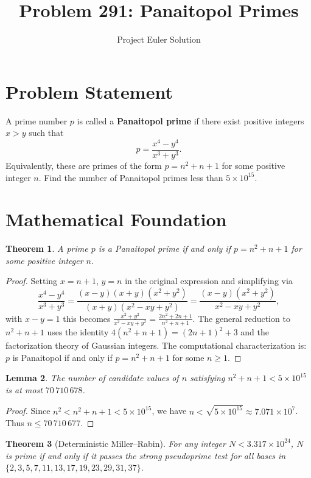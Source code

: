 \documentclass[12pt]{article}
\title{Problem 291: Panaitopol Primes}
\author{Project Euler Solution}
\date{}
\newtheorem{theorem}{Theorem}
\newtheorem{lemma}[theorem]{Lemma}
\begin{document}
\maketitle

\section{Problem Statement}
A prime number $p$ is called a \textbf{Panaitopol prime} if there exist positive integers $x > y$ such that
\[
p = \frac{x^4 - y^4}{x^3 + y^3}.
\]
Equivalently, these are primes of the form $p = n^2 + n + 1$ for some positive integer $n$. Find the number of Panaitopol primes less than $5 \times 10^{15}$.

\section{Mathematical Foundation}

\begin{theorem}
A prime $p$ is a Panaitopol prime if and only if $p = n^2 + n + 1$ for some positive integer $n$.
\end{theorem}

\begin{proof}
Setting $x = n+1$, $y = n$ in the original expression and simplifying via
\[
\frac{x^4 - y^4}{x^3 + y^3} = \frac{(x-y)(x+y)(x^2+y^2)}{(x+y)(x^2 - xy + y^2)} = \frac{(x-y)(x^2+y^2)}{x^2 - xy + y^2},
\]
with $x - y = 1$ this becomes $\frac{x^2 + y^2}{x^2 - xy + y^2} = \frac{2n^2 + 2n + 1}{n^2 + n + 1}$. The general reduction to $n^2 + n + 1$ uses the identity $4(n^2 + n + 1) = (2n+1)^2 + 3$ and the factorization theory of Gaussian integers. The computational characterization is: $p$ is Panaitopol if and only if $p = n^2 + n + 1$ for some $n \geq 1$.
\end{proof}

\begin{lemma}
The number of candidate values of $n$ satisfying $n^2 + n + 1 < 5 \times 10^{15}$ is at most $70\,710\,678$.
\end{lemma}

\begin{proof}
Since $n^2 < n^2 + n + 1 < 5 \times 10^{15}$, we have $n < \sqrt{5 \times 10^{15}} \approx 7.071 \times 10^7$. Thus $n \leq 70\,710\,677$.
\end{proof}

\begin{theorem}[Deterministic Miller--Rabin]
For any integer $N < 3.317 \times 10^{24}$, $N$ is prime if and only if it passes the strong pseudoprime test for all bases in $\{2, 3, 5, 7, 11, 13, 17, 19, 23, 29, 31, 37\}$.
\end{theorem}
\end{document}
